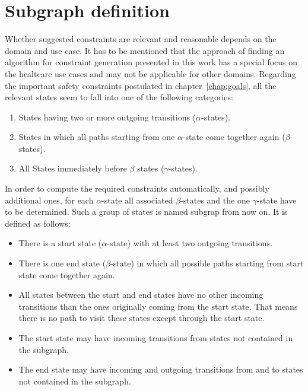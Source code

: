 \section{Subgraph definition}
\label{sec:subgraphdefinition}

Whether suggested constraints are relevant and reasonable
depends on the domain and use case. It has to be mentioned that the approach of finding an algorithm for constraint generation presented in this work has a special focus on the healtcare use cases and may not be applicable for other domains.
Regarding the important safety constraints postulated in chapter~\ref{chap:goals}, all the relevant states seem to fall into one of the following categories:

\begin{enumerate}
	\item States having two or more outgoing transitions ($\alpha$-states).
	\item States in which all paths starting from one $\alpha$-state come together again ($\beta$-states).
	\item All States immediately before $\beta$ states ($\gamma$-states).
\end{enumerate}

In order to compute the required constraints automatically, and possibly additional ones, for each $\alpha$-state all associated $\beta$-states and the one $\gamma$-state have to be determined. Such a group of states is named subgrap from now on. It is defined as follows:

\begin{itemize}
	\item There is a start state ($\alpha$-state) with at least two outgoing transitions.
	\item There is one end state ($\beta$-state) in which all possible paths starting from start state come together again.
	\item All states between the start and end states have no other incoming transitions than the ones originally coming from the start state. That means there is no path to visit these states except through the start state.
	\item The start state may have incoming transitions from states not contained in the subgraph.
	\item The end state may have incoming and outgoing transitions from and to states not contained in the subgraph.
\end{itemize}

